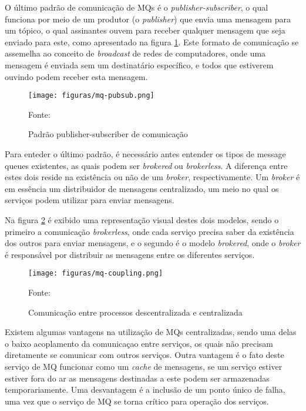 O último padrão de comunicação de \acp{MQ} é o \emph{publisher-subscriber},
o qual funciona por meio de um produtor (o \emph{publisher}) que envia uma
mensagem para um tópico, o qual assinantes ouvem para receber qualquer
mensagem que seja enviado para este, como apresentado na figura
\ref{fig:mq-pubsub}. Este formato de comunicação se assemelha ao conceito
de \emph{broadcast} de redes de computadores, onde uma mensagem é enviada
sem um destinatário específico, e todos que estiverem ouvindo podem receber
esta mensagem.

\begin{figure}[H]
	\centering
	\caption{Padrão publisher-subscriber de comunicação}
	\texttt{[image: figuras/mq-pubsub.png]}

	\label{fig:mq-pubsub}
	\footnotesize Fonte: 
\end{figure}

Para enteder o último padrão, é necessário antes entender os tipos de message
queues existentes, as quais podem ser \emph{brokered} ou \emph{brokerless}.
A diferença entre estes dois reside na existência ou não de um \emph{broker},
respectivamente. Um \emph{broker} é em essência um distribuidor de mensagens
centralizado, um meio no qual os serviços podem utilizar para enviar mensagens.

Na figura \ref{fig:mq-coupling} é exibido uma representação visual destes dois
modelos, sendo o primeiro a comunicação \emph{brokerless}, onde cada serviço
precisa saber da existência dos outros para enviar mensagens, e o segundo é
o modelo \emph{brokered}, onde o \emph{broker} é responsável por distribuir
as mensagens entre os diferentes serviços.

\begin{figure}[H]
	\centering
	\caption{Comunicação entre processos descentralizada e centralizada}
	\texttt{[image: figuras/mq-coupling.png]}

	\label{fig:mq-coupling}
	\footnotesize Fonte: 
\end{figure}

Existem algumas vantagens na utilização de \acp{MQ} centralizadas, sendo uma
delas o baixo acoplamento da comunicaçao entre serviços, os quais não precisam
diretamente se comunicar com outros serviços. Outra vantagem é o fato deste
serviço de \ac{MQ} funcionar como um \emph{cache} de mensagens, se um serviço
estiver estiver fora do ar as mensagens destinadas a este podem ser armazenadas
temporariamente. Uma desvantagem é a inclusão de um ponto único de falha,
uma vez que o serviço de \ac{MQ} se torna crítico para operação dos serviços.

